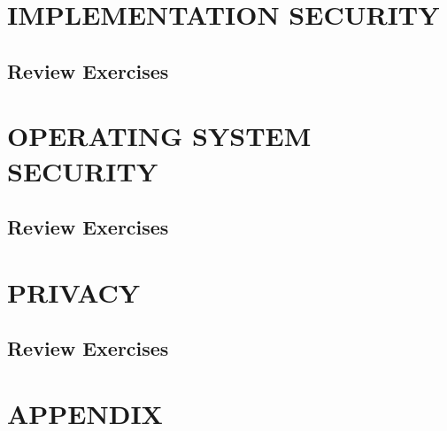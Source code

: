 \documentclass[a4paper, 10 pt, conference]{ieeeconf}
\begin{document}
\section{\textbf{IMPLEMENTATION SECURITY}}
\subsection{\textbf{Review Exercises}}






\section{\textbf{OPERATING SYSTEM SECURITY}}
\subsection{\textbf{Review Exercises}}






\section{\textbf{PRIVACY}}
\subsection{\textbf{Review Exercises}}

\section*{APPENDIX}



\end{document}
